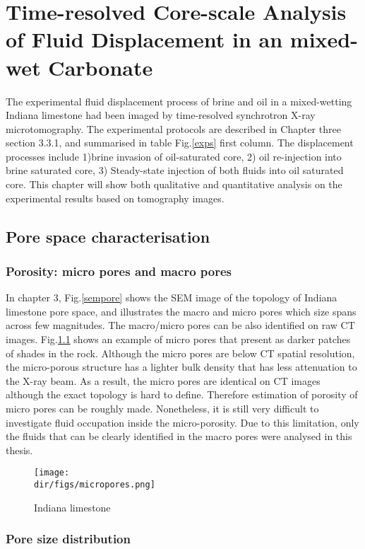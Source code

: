 \chapter{Time-resolved Core-scale Analysis of Fluid Displacement in an mixed-wet Carbonate}
 
The experimental fluid displacement process of brine and oil in a mixed-wetting Indiana limestone had been imaged by time-resolved synchrotron X-ray microtomography. The experimental protocols are described in Chapter three section 3.3.1, and summarised in table Fig.\ref{exps} first column. The displacement processes include 1)brine invasion of oil-saturated core, 2) oil re-injection into brine saturated core, 3) Steady-state injection of both fluids into oil saturated core. This chapter will show both qualitative and quantitative analysis on the experimental results based on tomography images.

\section{Pore space characterisation}
\subsection{Porosity: micro pores and macro pores}
In chapter 3, Fig.\ref{sempore} shows the SEM image of the topology of Indiana limestone pore space, and illustrates the macro and micro pores which size spans across few magnitudes. The macro/micro pores can be also identified on raw CT images. Fig.\ref{micropores} shows an example of micro pores that present as darker patches of shades in the rock. Although the micro pores are below CT spatial resolution, the micro-porous structure has a lighter bulk density that has less attenuation to the X-ray beam. As a result, the micro pores are identical on CT images although the exact topology is hard to define. Therefore estimation of porosity of micro pores can be roughly made. Nonetheless, it is still very difficult to investigate fluid occupation inside the micro-porosity. Due to this limitation, only the fluids that can be clearly identified in the macro pores were analysed in this thesis.

\begin{figure}[htbp]
  \centering
  \texttt{[image: \\dir/figs/micropores.png]}
  \caption{Indiana limestone}
  \label{micropores}
\end{figure}

\subsection{Pore size distribution}


